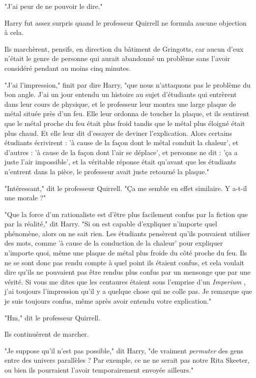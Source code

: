 "J'ai peur de ne pouvoir le dire."

Harry fut assez surpris quand le professeur Quirrell ne formula aucune objection à cela.

Ils marchèrent, pensifs, en direction du bâtiment de Gringotts, car aucun d'eux n'était le genre de personne qui aurait abandonné un problème sans l'avoir considéré pendant au moins cinq minutes.

"J'ai l'impression," finit par dire Harry, "que nous n'attaquons pas le problème du bon angle. J'ai un jour entendu un histoire au sujet d'étudiants qui entrèrent dans leur cours de physique, et le professeur leur montra une large plaque de métal située près d'un feu. Elle leur ordonna de toucher la plaque, et ils sentirent que le métal proche du feu était plus froid tandis que le métal plus éloigné était plus chaud. Et elle leur dit d'essayer de deviner l'explication. Alors certains étudiants écrivirent : 'à cause de la façon dont le métal conduit la chaleur', et d'autres : 'à cause de la façon dont l'air se déplace', et personne ne dit : 'ça a juste l'air impossible', et la véritable réponse était qu'avant que les étudiants n'entrent dans la pièce, le professeur avait juste retourné la plaque."

"Intéressant," dit le professeur Quirrell. "Ça me semble en effet similaire. Y a-t-il une morale ?"

"Que la force d'un rationaliste est d'être plus facilement confus par la fiction que par la réalité," dit Harry. "Si on est capable d'expliquer n'importe quel phénomène, alors on ne sait rien. Les étudiants pensèrent qu'ils pouvaient utiliser des mots, comme 'à cause de la conduction de la chaleur' pour expliquer n'importe quoi, même une plaque de métal plus froide du côté proche du feu. Ils ne se sont donc pas rendu compte à quel point ils étaient confus, et cela voulait dire qu'ils ne pouvaient pas être rendus plus confus par un mensonge que par une vérité. Si vous me dites que les centaures étaient sous l'emprise d'un \emph{Imperium} , j'ai toujours l'impression qu'il y a quelque chose qui ne colle pas. Je remarque que je suis toujours confus, même après avoir entendu votre explication."

"Hm," dit le professeur Quirrell.

Ils continuèrent de marcher.

"Je suppose qu'il n'est pas possible," dit Harry, "de vraiment \emph{permuter}  des gens entre des univers parallèles ? Par exemple, ce ne ne serait pas notre Rita Skeeter, ou bien ils pourraient l'avoir temporairement envoyée ailleurs."

